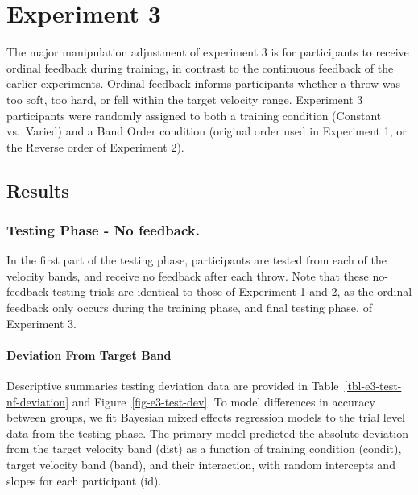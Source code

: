 \documentclass[
  letterpaper,
  DIV=11,
  numbers=noendperiod,
  oneside]{scrartcl}
\let\oldparagraph\paragraph
\renewcommand{\paragraph}[1]{\oldparagraph{#1}\mbox{}}
\begin{document}
\section{Experiment 3}\label{experiment-3}

The major manipulation adjustment of experiment 3 is for participants to
receive ordinal feedback during training, in contrast to the continuous
feedback of the earlier experiments. Ordinal feedback informs
participants whether a throw was too soft, too hard, or fell within the
target velocity range. Experiment 3 participants were randomly assigned
to both a training condition (Constant vs.~Varied) and a Band Order
condition (original order used in Experiment 1, or the Reverse order of
Experiment 2).

\subsection{Results}\label{results-1}

\subsubsection{Testing Phase - No
feedback.}\label{testing-phase---no-feedback.-2}

In the first part of the testing phase, participants are tested from
each of the velocity bands, and receive no feedback after each throw.
Note that these no-feedback testing trials are identical to those of
Experiment 1 and 2, as the ordinal feedback only occurs during the
training phase, and final testing phase, of Experiment 3.

\paragraph{Deviation From Target
Band}\label{deviation-from-target-band-2}

Descriptive summaries testing deviation data are provided in
Table~\ref{tbl-e3-test-nf-deviation} and Figure~\ref{fig-e3-test-dev}.
To model differences in accuracy between groups, we fit Bayesian mixed
effects regression models to the trial level data from the testing
phase. The primary model predicted the absolute deviation from the
target velocity band (dist) as a function of training condition
(condit), target velocity band (band), and their interaction, with
random intercepts and slopes for each participant (id).

\end{document}
